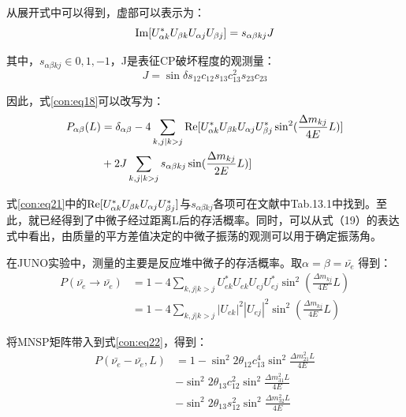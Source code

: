 \documentclass[10pt,a4paper]{article}
\begin{document}
从展开式中可以得到，虚部可以表示为：
\begin{equation}
\label{con:eq20}
{\rm Im}[U_{\alpha k}^{*}U_{\beta k}U_{\alpha j}U_{\beta j}]=s_{\alpha \beta kj}J
\end{equation}


其中，$s_{\alpha \beta kj}\in {0,1,-1}$，J是表征CP破坏程度的观测量：
\[
J=\sin\delta s_{12}c_{12}s_{13}c_{13}^2 s_{23}c_{23}
\]


因此，式\eqref{con:eq18}可以改写为：
\begin{equation}
\label{con:eq21}
\begin{aligned}
P_{\alpha\beta}(L)&=\delta_{\alpha\beta}-4\sum_{k,j |k>j}{\rm Re}[U_{\alpha k}^{*}U_{\beta k}U_{\alpha j}U_{\beta j}^{*}\sin^2(\frac{\Delta m_{kj}}{4E}L)]
\\&+2J\sum_{k,j |k>j}s_{\alpha \beta kj}\sin(\frac{\Delta m_{kj}}{2E}L)]
\end{aligned}
\end{equation}


式\eqref{con:eq21}中的${\rm Re}[U_{\alpha k}^{*}U_{\beta k}U_{\alpha j}U_{\beta j}^{*}]$与$s_{\alpha \beta kj}$各项可在文献\cite{2007fun}中Tab.13.1中找到。至此，就已经得到了中微子经过距离L后的存活概率。同时，可以从式（19）的表达式中看出，由质量的平方差值决定的中微子振荡的观测可以用于确定振荡角。


在JUNO实验中，测量的主要是反应堆中微子的存活概率。取$\alpha=\beta=\bar{\nu_e}$
得到：
\begin{equation}
\label{con:eq22}
\begin{split}
P(\bar{\nu_e}\rightarrow\bar{\nu_e})&=1-4\sum_{k,j |k>j}U_{e k}^{*}U_{e k}U_{e j}U_{e j}^{*}\sin^2(\frac{\Delta m_{kj}}{4E}L)
\\&=1-4\sum_{k,j |k>j}|U_{e k}|^2|U_{e j}|^2\sin^2(\frac{\Delta m_{kj}}{4E}L)
\end{split}
\end{equation}


将MNSP矩阵带入到式\eqref{con:eq22}，得到：
\begin{equation}
\label{con:eq23}
\begin{split}
P(\bar{\nu_e}-\bar{\nu_e},L)&=1-{\sin^2{2\theta_{12}}} c_{13}^4\sin^2{\frac{\Delta{m_{21}^2}L}{4E}}\\&-
\sin^2{2\theta_{13}} c_{12}^2\sin^2{\frac{\Delta{m_{31}^2}L}{4E}}
\\&-\sin^2{2\theta_{13}} s_{12}^2\sin^2{\frac{\Delta{m_{32}^2}L}{4E}}
\end{split}
\end{equation}
\end{document}
